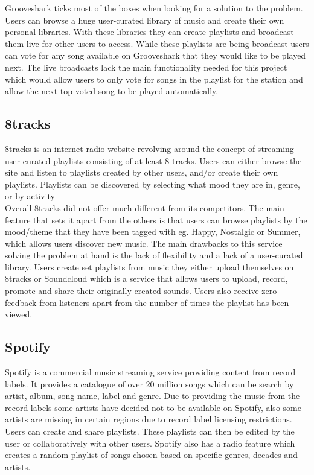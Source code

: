 \documentclass[a4paper, 12pt]{report}
\begin{document}
Grooveshark ticks most of the boxes when looking for a solution to the problem. Users can browse a huge user-curated library of music and create their own personal libraries. With these libraries they can create playlists and broadcast them live for other users to access. While these playlists are being broadcast users can vote for any song available on Grooveshark that they would like to be played next. The live broadcasts lack the main functionality needed for this project which would allow users to only vote for songs in the playlist for the station and allow the next top voted song to be played automatically.

\subsection{8tracks}
8tracks\cite{8tracks} is an internet radio website revolving around the concept of streaming user curated playlists consisting of at least 8 tracks. Users can either browse the site and listen to playlists created by other users, and/or create their own playlists. Playlists can be discovered by selecting what mood they are in, genre, or by activity\\

Overall 8tracks did not offer much different from its competitors. The main feature that sets it apart from the others is that users can browse playlists by the mood/theme that they have been tagged with eg. Happy, Nostalgic or Summer, which allows users discover new music.
The main drawbacks to this service solving the problem at hand is the lack of flexibility and a lack of a user-curated library. Users create set playlists from music they either upload themselves on 8tracks or Soundcloud\cite{soundcloud} which is a service that allows users to upload, record, promote and share their originally-created sounds. Users also receive zero feedback from listeners apart from the number of times the playlist has been viewed. 

\subsection{Spotify}
Spotify\cite{Spotify} is a commercial music streaming service providing content from record labels. It provides a catalogue of over 20 million songs which can be search by artist, album, song name, label and genre. Due to providing the music from the record labels some artists have decided not to be available on Spotify, also some artists are missing in certain regions due to record label licensing restrictions. \\
Users can create and share playlists. These playlists can then be edited by the user or collaboratively with other users. Spotify also has a radio feature which creates a random playlist of songs chosen based on specific genres, decades and artists.\\
\end{document}

